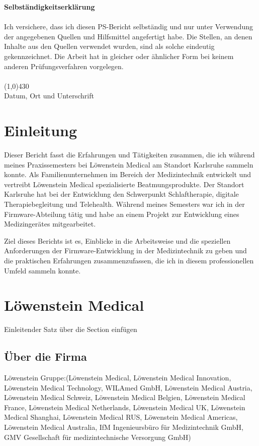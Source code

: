 \documentclass[a4paper, 12pt]{article}
\begin{document}
\newpage
\tableofcontents 
\newpage

{\bfseries Selbständigkeitserklärung}\\ \\
Ich versichere, dass ich diesen PS-Bericht selbständig und nur unter Verwendung der angegebenen
Quellen und Hilfsmittel angefertigt habe. Die Stellen, an denen Inhalte aus den Quellen verwendet
wurden, sind als solche eindeutig gekennzeichnet. Die Arbeit hat in gleicher oder ähnlicher Form bei
keinem anderen Prüfungsverfahren vorgelegen. \\
\vspace{1.0cm} \\
\line(1,0){430} \\
Datum, Ort und Unterschrift\\

\newpage
\section{Einleitung}\label{Einleitung} 
Dieser Bericht fasst die Erfahrungen und Tätigkeiten zusammen, die ich während meines Praxissemesters bei Löwenstein Medical am Standort Karlsruhe sammeln konnte. Als Familienunternehmen im Bereich der Medizintechnik entwickelt und vertreibt Löwenstein Medical spezialisierte Beatmungsprodukte. Der Standort Karlsruhe hat bei der Entwicklung den Schwerpunkt Schlaftherapie, digitale Therapiebegleitung und Telehealth. Während meines Semesters war ich in der Firmware-Abteilung tätig und habe an einem Projekt zur Entwicklung eines Medizingerätes mitgearbeitet. 

Ziel dieses Berichts ist es, Einblicke in die Arbeitsweise und die speziellen Anforderungen der Firmware-Entwicklung in der Medizintechnik zu geben und die praktischen Erfahrungen zusammenzufassen, die ich in diesem professionellen Umfeld sammeln konnte. 

\newpage
\section{Löwenstein Medical}\label{loewenstein}
Einleitender Satz über die Section einfügen \cite{loewenstein}

\subsection{Über die Firma} %
Löwenstein Gruppe:(Löwenstein Medical, Löwenstein Medical Innovation, 
Löwenstein Medical Technology, WILAmed GmbH, Löwenstein Medical Austria, 
Löwenstein Medical Schweiz, Löwenstein Medical Belgien, Löwenstein Medical France,
Löwenstein Medical Netherlands, Löwenstein Medical UK, Löwenstein Medical Shanghai,
Löwenstein Medical RUS, Löwenstein Medical Americas, Löwenstein Medical Australia, 
IfM Ingenieursbüro für Medizintechnik GmbH, 
GMV Gesellschaft für medizintechnische Versorgung GmbH)
\end{document}
